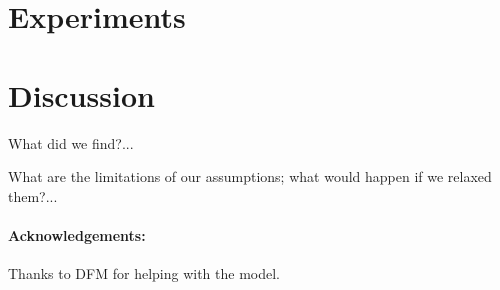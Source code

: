 \documentclass[12pt, letterpaper]{article}
\begin{document}
\section{Experiments}

\section{Discussion}

What did we find?...

What are the limitations of our assumptions; what would happen if we relaxed them?...

\paragraph{Acknowledgements:}
Thanks to DFM for helping with the model.
\end{document}
